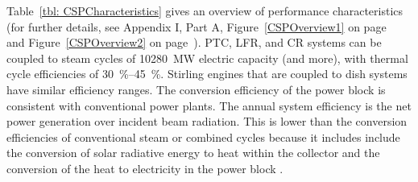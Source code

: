 
Table~\ref{tbl: CSPCharacteristics} gives an overview of performance characteristics (for further details, see Appendix I, Part A, Figure~\ref{CSPOverview1} on page~\pageref{CSPOverview1} and Figure~\ref{CSPOverview2} on page~\pageref{CSPOverview2}). PTC, LFR, and CR systems can be coupled to steam cycles of \SI{10280}{\mega\watt} electric capacity (and more), with thermal cycle efficiencies of \SIrange{30}{45}{\percent}. Stirling engines that are coupled to dish systems have similar efficiency ranges. The conversion efficiency of the power block is consistent with conventional power plants. The annual system efficiency is the net power generation over incident beam radiation. This is lower than the conversion efficiencies of conventional steam or combined cycles because it includes include the conversion of solar radiative energy to heat within the collector and the conversion of the heat to electricity in the power block \cite{Pitz-Paal.2013}.

